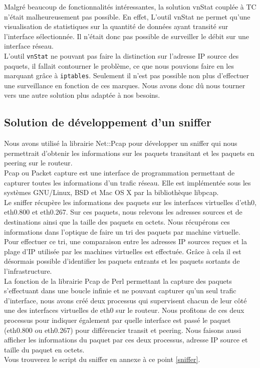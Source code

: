 			Malgré beaucoup de fonctionnalités intéressantes, la solution vnStat couplée à TC n'était malheureusement pas possible. En effet, L'outil vnStat ne permet qu'une visualisation de statistiques sur la quantité de données ayant transité sur l'interface sélectionnée. Il n'était donc pas possible de surveiller le débit sur une interface réseau.\\
			 
			L'outil \verb?vnStat? ne pouvant pas faire la distinction sur l'adresse IP source des paquets, il fallait contourner le problème, ce que nous pouvions faire en les marquant grâce à \verb?iptables?. Seulement il n'est pas possible non plus d'effectuer une surveillance en fonction de ces marques. Nous avons donc dû nous tourner vers une autre solution plus adaptée à nos besoins.

	\subsection{Solution de développement d'un sniffer}
		\vspace{0.3cm}

		Nous avons utilisé la librairie Net::Pcap pour développer un sniffer qui nous permettrait d'obtenir les informations sur les paquets transitant et les paquets en peering sur le routeur.\\
	
		Pcap ou Packet capture est une interface de programmation permettant de capturer toutes les informations d'un trafic réseau. Elle est implémentée sous les systèmes GNU/Linux, BSD et Mac OS X par la bibliothèque libpcap.\\
	
		Le sniffer récupère les informations des paquets sur les interfaces virtuelles d'eth0, eth0.800 et eth0.267. Sur ces paquets, nous relevons les adresses sources et de destinations ainsi que la taille des paquets en octets. Nous récupérons ces informations dans l'optique de faire un tri des paquets par machine virtuelle.\\

		Pour effectuer ce tri, une comparaison entre les adresses IP sources reçues et la plage d'IP utilisée par les machines virtuelles est effectuée. Grâce à cela il est désormais possible d'identifier les paquets entrants et les paquets sortants de l'infrastructure.\\

		La fonction de la librairie Pcap de Perl permettant la capture des paquets s'effectuant dans une boucle infinie et ne pouvant capturer qu'un seul trafic d'interface, nous avons créé deux processus qui supervisent chacun de leur côté une des interfaces virtuelles de eth0 sur le routeur. Nous profitons de ces deux processus pour indiquer également par quelle interface est passé le paquet (eth0.800 ou eth0.267) pour différencier transit et peering. Nous faisons aussi afficher les informations du paquet par ces deux processus, adresse IP source et taille du paquet en octets.\\

		Vous trouverez le script du sniffer en annexe à ce point \ref{sniffer}.\\

\newpage
